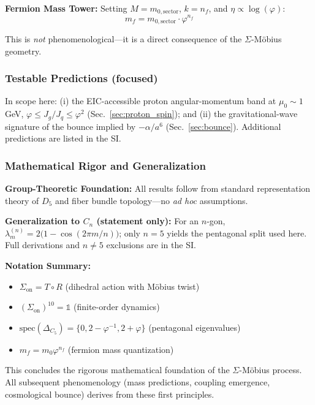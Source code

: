 \documentclass[12pt]{article}
\theoremstyle{definition}
\theoremstyle{plain}
\begin{document}
\textbf{Fermion Mass Tower:} Setting $M = m_{0,\text{sector}}$, $k = n_f$, and $\eta \propto \log(\varphi)$:
\begin{equation}
\boxed{m_f = m_{0,\text{sector}} \cdot \varphi^{n_f}}
\end{equation}

This is \textit{not} phenomenological—it is a direct consequence of the $\Sigma$-M\"obius geometry.

\subsubsection{Testable Predictions (focused)}
In scope here: (i) the EIC-accessible proton angular-momentum band at $\mu_0\!\sim\!1$ GeV, \(\varphi \le J_g/J_q \le \varphi^2\) (Sec.~\ref{sec:proton_spin}); and (ii) the gravitational-wave signature of the bounce implied by $-\alpha/a^6$ (Sec.~\ref{sec:bounce}). Additional predictions are listed in the SI.

\subsubsection{Mathematical Rigor and Generalization}

\textbf{Group-Theoretic Foundation:} All results follow from standard representation theory of $D_5$ and fiber bundle topology—no \textit{ad hoc} assumptions.

\textbf{Generalization to $C_n$ (statement only):} For an $n$-gon, $\lambda_m^{(n)} = 2\big(1 - \cos(2\pi m/n)\big)$; only $n=5$ yields the pentagonal split used here. Full derivations and $n\neq5$ exclusions are in the SI.

\textbf{Notation Summary:}
\begin{itemize}
\item $\Sigma_{\text{on}} = T \circ R$ (dihedral action with M\"obius twist)
\item $(\Sigma_{\text{on}})^{10} = \mathbb{1}$ (finite-order dynamics)
\item $\text{spec}(\Delta_{C_5}) = \{0, 2 - \varphi^{-1}, 2 + \varphi\}$ (pentagonal eigenvalues)
\item $m_f = m_0 \varphi^{n_f}$ (fermion mass quantization)
\end{itemize}

This concludes the rigorous mathematical foundation of the $\Sigma$-M\"obius process. All subsequent phenomenology (mass predictions, coupling emergence, cosmological bounce) derives from these first principles.
\end{document}
